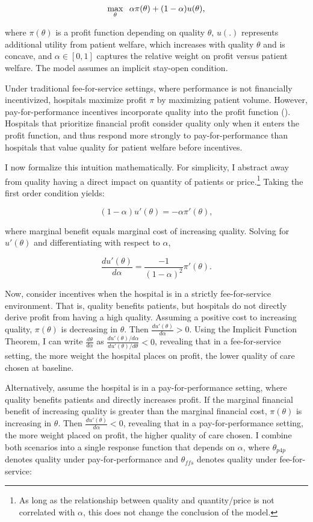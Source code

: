 \documentclass[12pt]{article}
\begin{document}
    $$\max_{\theta}\hspace{2mm}\alpha\pi(\theta) + (1-\alpha) u(\theta),$$

    \noindent where $\pi(\theta)$ is a profit function depending on quality $\theta$, $u(.)$ represents additional utility from patient welfare, which increases with quality $\theta$ and is concave, and $\alpha\in[0,1]$ captures the relative weight on profit versus patient welfare. The model assumes an implicit stay-open condition.

    Under traditional fee-for-service settings, where performance is not financially incentivized, hospitals maximize profit $\pi$ by maximizing patient volume. However, pay-for-performance incentives incorporate quality into the profit function (\cite{dranove2011health}). Hospitals that prioritize financial profit consider quality only when it enters the profit function, and thus respond more strongly to pay-for-performance than hospitals that value quality for patient welfare before incentives.
    
    I now formalize this intuition mathematically. For simplicity, I abstract away from quality having a direct impact on quantity of patients or price.\footnote{As long as the relationship between quality and quantity/price is not correlated with $\alpha$, this does not change the conclusion of the model.} Taking the first order condition yields: 

    $$(1-\alpha)u'(\theta) = -\alpha \pi'(\theta),$$

    \noindent where marginal benefit equals marginal cost of increasing quality. Solving for $u'(\theta)$ and differentiating with respect to $\alpha$,

    $$\frac{du'(\theta)}{d\alpha} = \frac{-1}{(1-\alpha)^2}\pi'(\theta).$$

    Now, consider incentives when the hospital is in a strictly fee-for-service environment. That is, quality benefits patients, but hospitals do not directly derive profit from having a high quality. Assuming a positive cost to increasing quality, $\pi(\theta)$ is decreasing in $\theta$. Then $\frac{du'(\theta)}{d\alpha} > 0$. Using the Implicit Function Theorem, I can write $\frac{d\theta}{d\alpha}$ as 
    $\frac{du'(\theta)/d\alpha}{du'(\theta)/d\theta}<0$, revealing that in a fee-for-service setting, the more weight the hospital places on profit, the lower quality of care chosen at baseline.

    Alternatively, assume the hospital is in a pay-for-performance setting, where quality benefits patients and directly increases profit. If the marginal financial benefit of increasing quality is greater than the marginal financial cost, $\pi(\theta)$ is increasing in $\theta$. Then $\frac{du'(\theta)}{d\alpha} < 0$, revealing that in a pay-for-performance setting, the more weight placed on profit, the higher quality of care chosen. I combine both scenarios into a single response function that depends on $\alpha$, where $\theta_{p4p}$ denotes quality under pay-for-performance and $\theta_{ffs}$ denotes quality under fee-for-service: 
\end{document}
